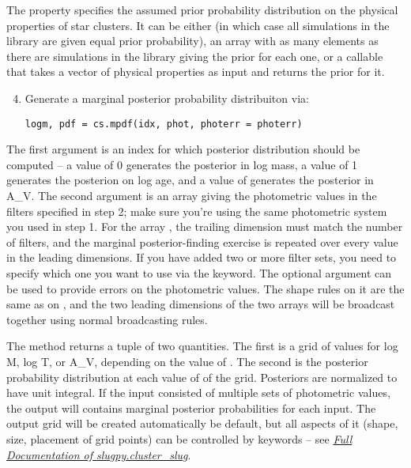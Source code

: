 \documentclass[letterpaper,10pt,english]{sphinxmanual}
\begin{document}
The  property specifies the assumed prior probability distribution on the physical properties of star clusters. It can be either  (in which case all simulations in the library are given equal prior probability), an array with as many elements as there are simulations in the library giving the prior for each one, or a callable that takes a vector of physical properties as input and returns the prior for it.
\begin{enumerate}
\setcounter{enumi}{3}
\item {} 
Generate a marginal posterior probability distribuiton via:

\begin{Verbatim}[commandchars=\\\{\}]
logm, pdf = cs.mpdf(idx, phot, photerr = photerr)
\end{Verbatim}

\end{enumerate}

The first argument  is an index for which posterior distribution should be computed -- a value of 0 generates the posterior in log mass, a value of 1 generates the posterion on log age, and a value of generates the posterior in A\_V. The second argument  is an array giving the photometric values in the filters specified in step 2; make sure you're using the same photometric system you used in step 1. For the array , the trailing dimension must match the number of filters, and the marginal posterior-finding exercise is repeated over every value in the leading dimensions. If you have added two or more filter sets, you need to specify which one you want to use via the  keyword. The optional argument  can be used to provide errors on the photometric values. The shape rules on it are the same as on , and the two leading dimensions of the two arrays will be broadcast together using normal broadcasting rules.

The  method returns a tuple of two quantities. The first is a grid of values for log M, log T, or A\_V, depending on the value of . The second is the posterior probability distribution at each value of of the grid. Posteriors are normalized to have unit integral. If the input consisted of multiple sets of photometric values, the output will contains marginal posterior probabilities for each input. The output grid will be created automatically be default, but all aspects of it (shape, size, placement of grid points) can be controlled by keywords -- see {\hyperref[cluster_slug:ssec-cluster-slug-full]{\emph{Full Documentation of slugpy.cluster\_slug}}}.
\end{document}
